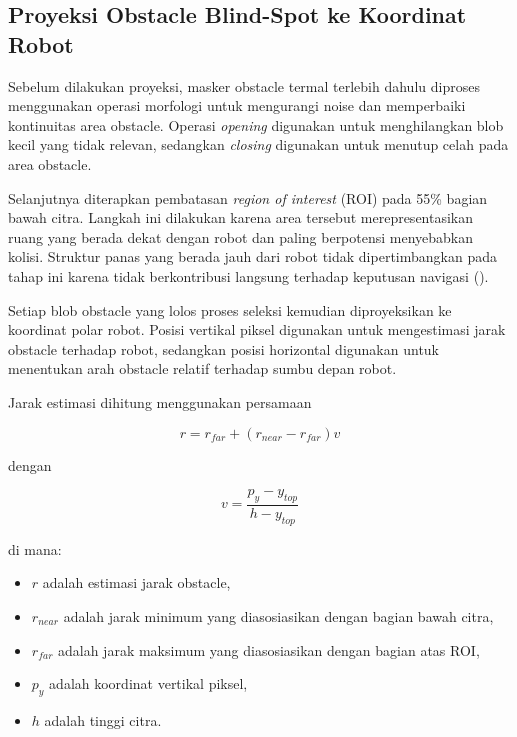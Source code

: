 \subsection{Proyeksi Obstacle Blind-Spot ke Koordinat Robot}

Sebelum dilakukan proyeksi, masker obstacle termal terlebih dahulu diproses menggunakan operasi morfologi untuk mengurangi noise dan memperbaiki kontinuitas area obstacle. Operasi \textit{opening} digunakan untuk menghilangkan blob kecil yang tidak relevan, sedangkan \textit{closing} digunakan untuk menutup celah pada area obstacle.

Selanjutnya diterapkan pembatasan \textit{region of interest} (ROI) pada 55\% bagian bawah citra. Langkah ini dilakukan karena area tersebut merepresentasikan ruang yang berada dekat dengan robot dan paling berpotensi menyebabkan kolisi. Struktur panas yang berada jauh dari robot tidak dipertimbangkan pada tahap ini karena tidak berkontribusi langsung terhadap keputusan navigasi (\cite{Kibii2022}).

Setiap blob obstacle yang lolos proses seleksi kemudian diproyeksikan ke koordinat polar robot. Posisi vertikal piksel digunakan untuk mengestimasi jarak obstacle terhadap robot, sedangkan posisi horizontal digunakan untuk menentukan arah obstacle relatif terhadap sumbu depan robot.

Jarak estimasi dihitung menggunakan persamaan

\begin{equation}
r = r_{far} + (r_{near}-r_{far})v
\label{eq:range_projection}
\end{equation}

dengan

\begin{equation}
v=\frac{p_y-y_{top}}{h-y_{top}}
\end{equation}

di mana:

\begin{itemize}
\item $r$ adalah estimasi jarak obstacle,
\item $r_{near}$ adalah jarak minimum yang diasosiasikan dengan bagian bawah citra,
\item $r_{far}$ adalah jarak maksimum yang diasosiasikan dengan bagian atas ROI,
\item $p_y$ adalah koordinat vertikal piksel,
\item $h$ adalah tinggi citra.
\end{itemize}

